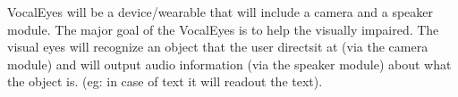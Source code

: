 Vocal\+Eyes will be a device/wearable that will include a camera and a speaker module. The major goal of the Vocal\+Eyes is to help the visually impaired. The visual eyes will recognize an object that the user directsit at (via the camera module) and will output audio information (via the speaker module) about what the object is. (eg\+: in case of text it will readout the text). 
